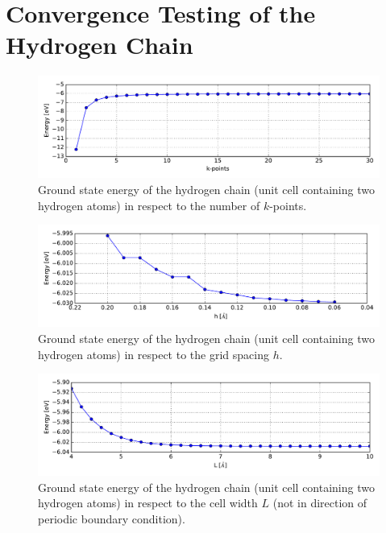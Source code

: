\section{Convergence Testing of the Hydrogen Chain}
\label{section_conv_hyd}
\begin{figure}[!h]
	\centering
	\includegraphics[width = 13cm]{Images/Hydrogen/convergence/kpts-energy}
	\caption{Ground state energy of the hydrogen chain (unit cell containing two hydrogen atoms) in respect to the number of $k$-points.}
	\label{}
\end{figure}
\begin{figure}[!h]
	\centering
	\includegraphics[width = 13cm]{Images/Hydrogen/convergence/gridspacing-energy}
	\caption{Ground state energy of the hydrogen chain (unit cell containing two hydrogen atoms) in respect to the grid spacing $h$.}
	\label{}
\end{figure}
\begin{figure}[!h]
	\centering
	\includegraphics[width = 13cm]{Images/Hydrogen/convergence/unit_cell_width}
	\caption{Ground state energy of the hydrogen chain (unit cell containing two hydrogen atoms) in respect to the cell width $L$ (not in direction of periodic boundary condition).}
	\label{}
\end{figure}

